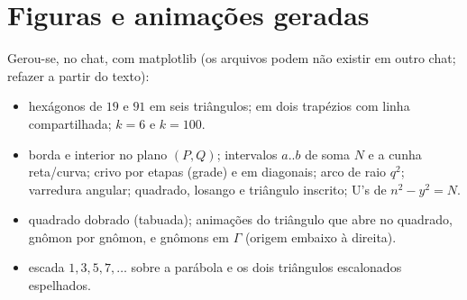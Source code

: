 \documentclass[11pt,a4paper]{article}
\begin{document}
\section{Figuras e animações geradas}
Gerou-se, no chat, com matplotlib (os arquivos podem não existir em outro chat; refazer a partir do texto):
\begin{itemize}[leftmargin=1.4em]
  \item hexágonos de $19$ e $91$ em seis triângulos; em dois trapézios com linha compartilhada; $k=6$ e $k=100$.
  \item borda e interior no plano $(P,Q)$; intervalos $a..b$ de soma $N$ e a cunha reta/curva; crivo por etapas (grade) e em diagonais; arco de raio $q^2$; varredura angular; quadrado, losango e triângulo inscrito; U's de $n^2-y^2=N$.
  \item quadrado dobrado (tabuada); animações do triângulo que abre no quadrado, gnômon por gnômon, e gnômons em $\Gamma$ (origem embaixo à direita).
  \item escada $1,3,5,7,\dots$ sobre a parábola e os dois triângulos escalonados espelhados.
\end{itemize}
\end{document}
